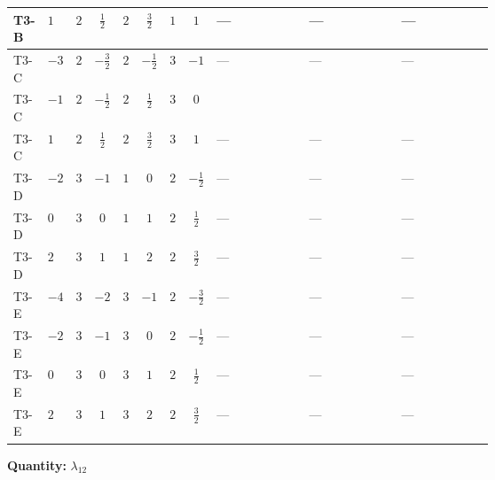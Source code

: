 \documentclass[8pt]{article}
\begin{document}
\begin{landscape}
\begin{longtable}{@{}llcccccc >{\raggedright\arraybackslash}p{0.21\linewidth} >{\raggedright\arraybackslash}p{0.21\linewidth} >{\raggedright\arraybackslash}p{0.21\linewidth}@{}}
\midrule
T3-B & $1$ & $2$ & $\frac{1}{2}$ & $2$ & $\frac{3}{2}$ & $1$ & $1$ & --- & --- & --- \\
\midrule
T3-C & $-3$ & $2$ & $-\frac{3}{2}$ & $2$ & $-\frac{1}{2}$ & $3$ & $-1$ & --- & --- & --- \\
\midrule
T3-C & $-1$ & $2$ & $-\frac{1}{2}$ & $2$ & $\frac{1}{2}$ & $3$ & $0$ & \scriptsize\adjustbox{max width=\linewidth}{$\begin{gathered} -3 {g_1}^2 {\lambda_{H H^\dagger S_1^\dagger S_2^\dagger}^{\rm Cross}}\end{gathered}$} & \scriptsize\adjustbox{max width=\linewidth}{$\begin{gathered} +2 {\lambda_{12}^{(1)}} {\lambda_{H H^\dagger S_1^\dagger S_2^\dagger}^{\rm Cross}}\end{gathered}$} & \scriptsize\adjustbox{max width=\linewidth}{$\begin{gathered} +3 {\lambda_1} {\lambda_{H H^\dagger S_1^\dagger S_2^\dagger}^{\rm Cross}}\end{gathered}$} \\
\midrule
T3-C & $1$ & $2$ & $\frac{1}{2}$ & $2$ & $\frac{3}{2}$ & $3$ & $1$ & --- & --- & --- \\
\midrule
T3-D & $-2$ & $3$ & $-1$ & $1$ & $0$ & $2$ & $-\frac{1}{2}$ & --- & --- & --- \\
\midrule
T3-D & $0$ & $3$ & $0$ & $1$ & $1$ & $2$ & $\frac{1}{2}$ & --- & --- & --- \\
\midrule
T3-D & $2$ & $3$ & $1$ & $1$ & $2$ & $2$ & $\frac{3}{2}$ & --- & --- & --- \\
\midrule
T3-E & $-4$ & $3$ & $-2$ & $3$ & $-1$ & $2$ & $-\frac{3}{2}$ & --- & --- & --- \\
\midrule
T3-E & $-2$ & $3$ & $-1$ & $3$ & $0$ & $2$ & $-\frac{1}{2}$ & --- & --- & --- \\
\midrule
T3-E & $0$ & $3$ & $0$ & $3$ & $1$ & $2$ & $\frac{1}{2}$ & --- & --- & --- \\
\midrule
T3-E & $2$ & $3$ & $1$ & $3$ & $2$ & $2$ & $\frac{3}{2}$ & --- & --- & --- \\
\midrule
\bottomrule
\end{longtable}
\clearpage
\noindent\textbf{Quantity: }$\lambda_{12}$\par\smallskip

\end{landscape}
\end{document}
